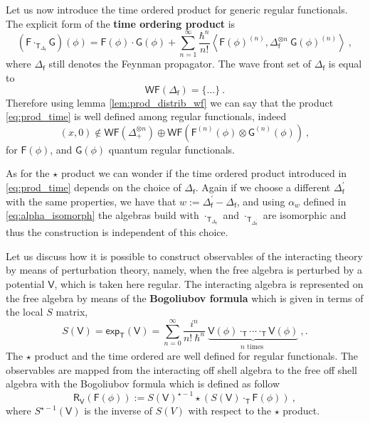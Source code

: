 \documentclass[11pt]{book}
\newcommand{\hilight}[1]{\colorbox{yellow!80!black}{#1}}
\newcommand{\WF}{\mathsf{WF}}
\renewcommand{\exp}{\mathsf{exp}}
\newcommand{\sm}[1]{\left\langle#1\right\rangle}
\newcommand{\Fsf}{\mathsf{F}}
\newcommand{\Gsf}{\mathsf{G}}
\newcommand{\Rsf}{\mathsf{R}}
\newcommand{\Tsf}{\mathsf{T}}
\newcommand{\Vsf}{\mathsf{V}}
\newcommand{\fsf}{\mathsf{f}}
\theoremstyle{break}
\begin{document}
Let us now introduce the time ordered product for generic regular functionals. The explicit form of the \textbf{time ordering product} is
%
\begin{equation}
(\Fsf \cdot_{\Tsf_{\Delta_\fsf}}  \Gsf)(\phi) = \Fsf(\phi) \cdot \Gsf(\phi) + \sum_{n=1}^\infty \frac{\hbar^n}{n!} \sm{ \Fsf(\phi)^{(n)} , \Delta_\fsf^{\otimes n} \ \Gsf(\phi)^{(n)} } \ ,
\label{eq:prod_time}
\end{equation}
%
where $\Delta_\fsf$ still denotes the Feynman propagator. The \hilight{wave front set of $\Delta_\fsf$} is equal to
%
\begin{equation}
\WF(\Delta_\fsf) = \bigg\{ ... \bigg\} \ . 
\end{equation}
%
Therefore using lemma \ref{lem:prod_distrib_wf} we can say that the product \eqref{eq:prod_time} is well defined among regular functionals, indeed
%
\begin{equation*}
(x,0) \notin \WF(\Delta_+^{\otimes n}) \oplus \WF\left(\Fsf^{(n)}(\phi) \otimes \Gsf^{(n)}(\phi)\right) \ ,
\end{equation*}
%
for $\Fsf(\phi)$, and $\Gsf(\phi)$ quantum regular functionals. 


\bigskip


As for the $\star$ product we can wonder if the time ordered product introduced in \eqref{eq:prod_time} depends on the choice of $\Delta_\fsf$. Again if we choose a different $\Delta^\prime_\fsf$ with the same properties, we have that $w:=\Delta^\prime_\fsf - \Delta_\fsf$, and using $\alpha_{w}$ defined in \eqref{eq:alpha_isomorph} the algebras build with $\cdot_{\Tsf_{\Delta_\fsf}}$ and $\cdot_{\Tsf_{\Delta^\prime_\fsf}}$ are isomorphic and thus the construction is independent of this choice.


\bigskip


Let us discuss how it is possible to construct observables of the interacting theory by means of perturbation theory, namely, when the free algebra is perturbed by a potential $\Vsf$, which is taken here regular. The interacting algebra is represented on the free algebra by means of the \textbf{Bogoliubov formula} which is given in terms of the local $S$ matrix, 
%
\begin{equation}
S(\Vsf) = \exp_\Tsf\left(\Vsf\right) = \sum^\infty_{n=0} \frac{i^n}{n!\ \hbar^n} \ \underbrace{\Vsf(\phi) \cdot_\Tsf \cdots \cdot_\Tsf \Vsf(\phi)}_{n \mbox{ times }} \ ,.
\label{eq:S_matrix}
\end{equation}
%
The $\star$ product and the time ordered are well defined for regular functionals. The observables are mapped from the interacting off shell algebra to the free off shell algebra with the Bogoliubov formula which is defined as follow
%
\begin{equation}
\Rsf_\Vsf(\Fsf(\phi)) := S(\Vsf)^{\star-1} \star \left( S(\Vsf) \cdot_\Tsf \Fsf(\phi) \right) \ ,
\label{eq:bogoliubov}
\end{equation}
%
where $S^{\star-1}(\Vsf)$ is the inverse of $S(V)$ with respect to the $\star$ product. 
\end{document}
